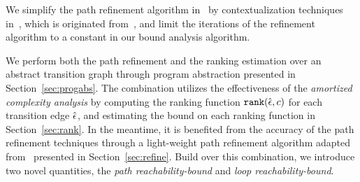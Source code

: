 \begin{itemize}
We simplify the path refinement algorithm in~\cite{GulwaniJK09} by contextualization techniques in~\cite{ZulegerGSV11,SinnZV14}, which is originated from~\cite{ManoliosV06},
and limit the iterations of the refinement algorithm to a constant in our bound analysis algorithm.
\end{itemize}
We perform both the path refinement and the ranking estimation over an abstract transition graph through program abstraction presented in Section~\ref{sec:progabs}.
The combination utilizes the effectiveness of the \emph{amortized complexity analysis} by computing the ranking function $\mathtt{rank}(\hat{\mathtt{\epsilon}{}}, c)$ for each transition edge $\hat{\mathtt{\epsilon}{}}$, and estimating the bound on each ranking function in Section~\ref{sec:rank}.
In the meantime, it is benefited from the accuracy of the path refinement techniques through a light-weight path refinement algorithm adapted from~\cite{GulwaniJK09} presented in Section~\ref{sec:refine}.
Build over this combination, we introduce two novel quantities,
the \emph{path reachability-bound} and \emph{loop reachability-bound}.
